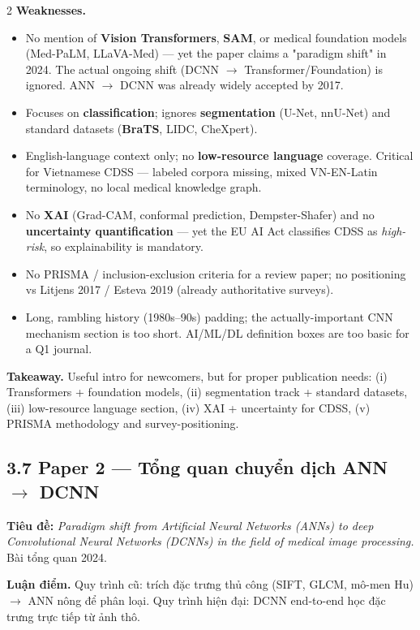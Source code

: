 \begin{paracol}{2}
\textbf{Weaknesses.}
\begin{itemize}[leftmargin=*,nosep]
  \item No mention of \textbf{Vision Transformers}, \textbf{SAM}, or medical foundation models (Med-PaLM, LLaVA-Med) — yet the paper claims a "paradigm shift" in 2024. The actual ongoing shift (DCNN $\to$ Transformer/Foundation) is ignored. ANN $\to$ DCNN was already widely accepted by 2017.
  \item Focuses on \textbf{classification}; ignores \textbf{segmentation} (U-Net, nnU-Net) and standard datasets (\textbf{BraTS}, LIDC, CheXpert).
  \item English-language context only; no \textbf{low-resource language} coverage. Critical for Vietnamese CDSS — labeled corpora missing, mixed VN-EN-Latin terminology, no local medical knowledge graph.
  \item No \textbf{XAI} (Grad-CAM, conformal prediction, Dempster-Shafer) and no \textbf{uncertainty quantification} — yet the EU AI Act classifies CDSS as \emph{high-risk}, so explainability is mandatory.
  \item No PRISMA / inclusion-exclusion criteria for a review paper; no positioning vs Litjens 2017 / Esteva 2019 (already authoritative surveys).
  \item Long, rambling history (1980s--90s) padding; the actually-important CNN mechanism section is too short. AI/ML/DL definition boxes are too basic for a Q1 journal.
\end{itemize}

\textbf{Takeaway.} Useful intro for newcomers, but for proper publication needs: (i) Transformers + foundation models, (ii) segmentation track + standard datasets, (iii) low-resource language section, (iv) XAI + uncertainty for CDSS, (v) PRISMA methodology and survey-positioning.

\switchcolumn

\subsection*{3.7 Paper 2 — Tổng quan chuyển dịch ANN $\to$ DCNN}
\textbf{Tiêu đề:} \emph{Paradigm shift from Artificial Neural Networks (ANNs) to deep Convolutional Neural Networks (DCNNs) in the field of medical image processing.} Bài tổng quan 2024.

\textbf{Luận điểm.} Quy trình cũ: trích đặc trưng thủ công (SIFT, GLCM, mô-men Hu) $\to$ ANN nông để phân loại. Quy trình hiện đại: DCNN end-to-end học đặc trưng trực tiếp từ ảnh thô.


\end{paracol}
